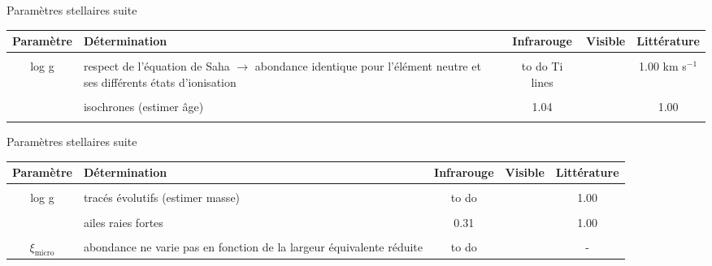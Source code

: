 \documentclass[10pt]{beamer}
\begin{document}
\begin{frame}[fragile]{Paramètres stellaires suite}
\begin{table}[h!]
    \begin{center}
        \begin{tabularx}{\textwidth}{c|X|c|c|c}
            Paramètre & Détermination & Infrarouge & Visible &Littérature \\
            \hline
            &&&\\
            log g & respect de l'équation de Saha  $\rightarrow$ abondance identique pour l'élément neutre et ses différents états d'ionisation & to do Ti lines && 1.00 km s$^{-1}$\\
            &&&\\
             & isochrones (estimer âge) & 1.04 && 1.00 \\
            &&&\\
        \end{tabularx}
    \end{center}
\end{table}

\end{frame}


\begin{frame}[fragile]{Paramètres stellaires suite}
\begin{table}[h!]
    \begin{center}
        \begin{tabularx}{\textwidth}{c|X|c|c|c}
            Paramètre & Détermination & Infrarouge & Visible &Littérature \\
            \hline
            &&&\\
            log g & tracés évolutifs (estimer masse) & to do && 1.00 \\
            &&&\\
            & ailes raies fortes & 0.31 && 1.00 \\
             &&&\\
            $\xi_{\text{micro}}$ & abondance ne varie pas en fonction de la largeur équivalente réduite & to do && - \\
        \end{tabularx}
    \end{center}
\end{table}

\end{frame}
\end{document}
